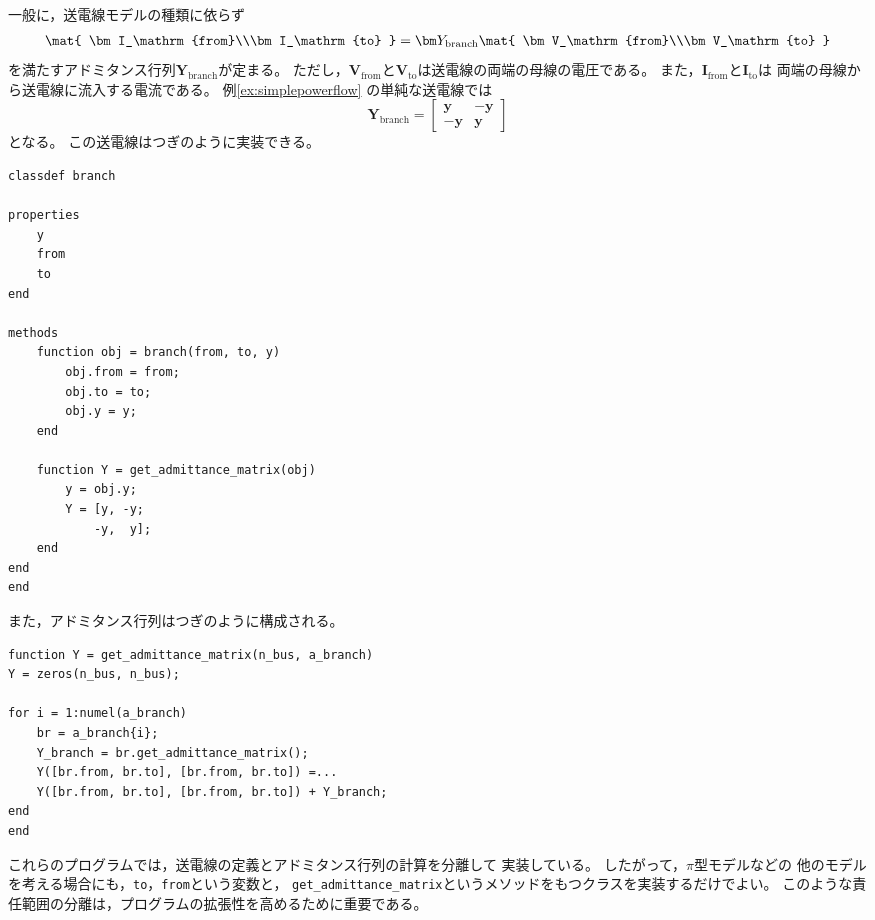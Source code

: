 \documentclass[tombow,dvipdfmx]{corona-a5-1.1}
\begin{document}
{\begin{例}[母線の実装の分離]
一般に，送電線モデルの種類に依らず
\begin{align}
\mat{
\bm I_\mathrm{from}\\\bm I_\mathrm{to}
} =
\bm Y_\mathrm{branch}
\mat{
\bm V_\mathrm{from}\\\bm V_\mathrm{to}
}
\end{align}
を満たすアドミタンス行列$\bm Y_\mathrm{branch}$が定まる。
ただし，$\bm V_\mathrm{from}$と$\bm V_\mathrm{to}$は送電線の両端の母線の電圧である。
また，$\bm I_\mathrm{from}$と$\bm I_\mathrm{to}$は
両端の母線から送電線に流入する電流である。
例\ref{ex:simplepowerflow}
の単純な送電線では
\[
\bm Y_\mathrm{branch} = \begin{bmatrix}
\bm y & -\bm y\\
-\bm y & \bm y
\end{bmatrix}
\]
となる。
この送電線はつぎのように実装できる。
\smallskip
\begin{PROGRAMA}[count,title={branch.m}]\label{program:branch}
\begin{verbatim}
classdef branch

properties
    y
    from
    to
end

methods
    function obj = branch(from, to, y)
        obj.from = from;
        obj.to = to;
        obj.y = y;
    end
    
    function Y = get_admittance_matrix(obj)
        y = obj.y;
        Y = [y, -y;
            -y,  y];
    end
end
end
\end{verbatim}\end{PROGRAMA}
また，アドミタンス行列はつぎのように構成される。
\smallskip
\begin{PROGRAMA}[count,title={get\_admittance\_matrix.m}]\label{program:admittance}
\begin{verbatim}
function Y = get_admittance_matrix(n_bus, a_branch)
Y = zeros(n_bus, n_bus);
    
for i = 1:numel(a_branch)
    br = a_branch{i};
    Y_branch = br.get_admittance_matrix();
    Y([br.from, br.to], [br.from, br.to]) =...
    Y([br.from, br.to], [br.from, br.to]) + Y_branch;
end
end
\end{verbatim}
\end{PROGRAMA}
これらのプログラムでは，送電線の定義とアドミタンス行列の計算を分離して
実装している。
したがって，$\pi$型モデルなどの
他のモデルを考える場合にも，\verb|to|，\verb|from|という変数と，
\verb|get_admittance_matrix|というメソッドをもつクラスを実装するだけでよい。
このような責任範囲の分離は，プログラムの拡張性を高めるために重要である。


\end{例}}
\end{document}
